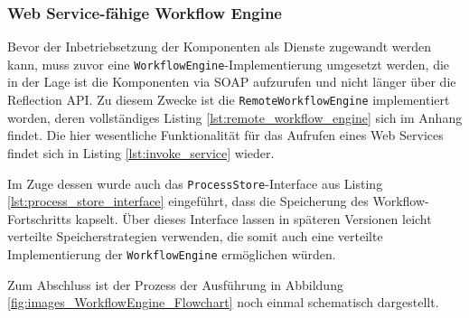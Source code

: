 
\subsubsection{Web Service-fähige Workflow Engine} %
\label{ssub:web_service_faehige_workflow_engine}

  Bevor der Inbetriebsetzung der Komponenten als Dienste zugewandt werden kann, muss zuvor eine \verb!WorkflowEngine!-Implementierung umgesetzt werden, die in der Lage ist die Komponenten via SOAP aufzurufen und nicht länger über die Reflection API. Zu diesem Zwecke ist die \verb!RemoteWorkflowEngine! implementiert worden, deren vollständiges Listing \ref{lst:remote_workflow_engine} sich im Anhang findet. Die hier wesentliche Funktionalität für das Aufrufen eines Web Services findet sich in Listing \ref{lst:invoke_service} wieder.
  
  
  
  Im Zuge dessen wurde auch das \verb!ProcessStore!-Interface aus Listing \ref{lst:process_store_interface} eingeführt, dass die Speicherung des Workflow-Fortschritts kapselt. Über dieses Interface lassen in späteren Versionen leicht verteilte Speicherstrategien verwenden, die somit auch eine verteilte Implementierung der \verb!WorkflowEngine! ermöglichen würden.
  
  
  
  Zum Abschluss ist der Prozess der Ausführung in Abbildung \ref{fig:images_WorkflowEngine_Flowchart} noch einmal schematisch dargestellt.
  
